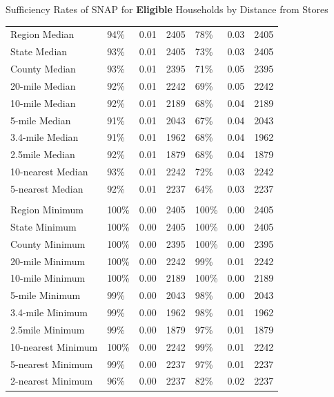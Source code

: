\documentclass{beamer}
\begin{document}
\begin{frame}
\begin{table}[htbp]{Sufficiency Rates of SNAP for \textbf{Eligible} Households by Distance from Stores}
\begin{adjustbox}{height=1.5in}
\begin{tabular}{lllllll}
    Region Median & 94\%  & 0.01  & 2405  & 78\%  & 0.03  & 2405 \\
    State Median & 93\%  & 0.01  & 2405  & 73\%  & 0.03  & 2405 \\
    County Median & 93\%  & 0.01  & 2395  & 71\%  & 0.05  & 2395 \\
    20-mile Median & 92\%  & 0.01  & 2242  & 69\%  & 0.05  & 2242 \\
    10-mile Median & 92\%  & 0.01  & 2189  & 68\%  & 0.04  & 2189 \\
    5-mile Median & 91\%  & 0.01  & 2043  & 67\%  & 0.04  & 2043 \\
    3.4-mile Median & 91\%  & 0.01  & 1962  & 68\%  & 0.04  & 1962 \\
    2.5mile Median & 92\%  & 0.01  & 1879  & 68\%  & 0.04  & 1879 \\
    10-nearest Median & 93\%  & 0.01  & 2242  & 72\%  & 0.03  & 2242 \\
    5-nearest Median & 92\%  & 0.01  & 2237  & 64\%  & 0.03  & 2237 \\
          &       &       &       &       &       &  \\
    Region Minimum & 100\% & 0.00  & 2405  & 100\% & 0.00  & 2405 \\
    State Minimum & 100\% & 0.00  & 2405  & 100\% & 0.00  & 2405 \\
    County Minimum & 100\% & 0.00  & 2395  & 100\% & 0.00  & 2395 \\
    20-mile Minimum & 100\% & 0.00  & 2242  & 99\%  & 0.01  & 2242 \\
    10-mile Minimum & 100\% & 0.00  & 2189  & 100\% & 0.00  & 2189 \\
    5-mile Minimum & 99\%  & 0.00  & 2043  & 98\%  & 0.00  & 2043 \\
    3.4-mile Minimum & 99\%  & 0.00  & 1962  & 98\%  & 0.01  & 1962 \\
    2.5mile Minimum & 99\%  & 0.00  & 1879  & 97\%  & 0.01  & 1879 \\
    10-nearest Minimum & 100\% & 0.00  & 2242  & 99\%  & 0.01  & 2242 \\
    5-nearest Minimum & 99\%  & 0.00  & 2237  & 97\%  & 0.01  & 2237 \\
    2-nearest Minimum & 96\%  & 0.00  & 2237  & 82\%  & 0.02  & 2237 \\
    \bottomrule
\end{tabular}
\end{adjustbox}
\end{table}
\end{frame}
\end{document}
